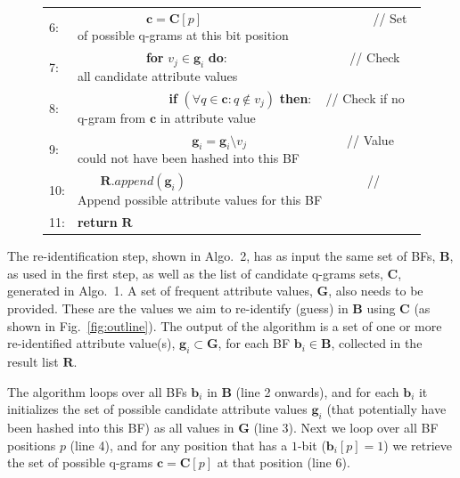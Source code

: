 \documentclass{llncs}
\begin{document}
\begin{figure}[t]
\begin{center}
\begin{scriptsize}
\begin{tabular}{ll}
  6:  & ~~~ ~~~ ~~~ $\mathbf{c} = \mathbf{C}[p]$  ~~~~~~~~~~~~~~~~
        ~~~~~~~~~\, // Set of possible q-grams at this bit position
        \\
  7:  & ~~~ ~~~ ~~~ \textbf{for} $v_j \in \mathbf{g}_i$ \textbf{do}: 
        ~~~~~~~~~~~~~~~~~~~// Check all candidate attribute
        values \\
  8:  & ~~~ ~~~ ~~~ ~~~ \textbf{if} $(\forall q \in \textbf{c}:
        q \notin v_j)$ \textbf{then}: ~ // Check if no q-gram from
        $\mathbf{c}$ in attribute value \\
  9:  & ~~~ ~~~ ~~~ ~~~ ~~~ $\mathbf{g}_i = \mathbf{g}_i \setminus
        v_j$ ~~~~~~~~~~~~~~~\,// Value could not have been hashed
        into this BF \\ 
  10: & ~~~ $\mathbf{R}.append(\mathbf{g}_i)$ ~~~~~~~~~~~~~~~~~~~~~
        ~~~~~~ // Append possible attribute values for this BF \\
  11: & \textbf{return} $\mathbf{R}$ \\
  \hline
  \end{tabular}
  \end{scriptsize}
  \end{center}
  \label{algo:step2}
\end{figure}

The re-identification step, shown in Algo.~2, has as input the same
set of BFs, $\mathbf{B}$, as used in the first step, as well as the
list of candidate q-grams sets, $\mathbf{C}$, generated in Algo.~1.
A set of frequent attribute values, $\mathbf{G}$, also needs to be
provided. These are the values we aim to re-identify (guess) in
$\mathbf{B}$ using $\mathbf{C}$ (as shown in
Fig.~\ref{fig:outline}). The output of the algorithm is a set
of one or more re-identified attribute value(s), $\mathbf{g}_i
\subset \mathbf{G}$, for each BF $\mathbf{b}_i \in \mathbf{B}$,
collected in the result list $\mathbf{R}$.

The algorithm loops over all BFs $\mathbf{b}_i$ in $\mathbf{B}$ (line
2 onwards), and for each $\mathbf{b}_i$ it initializes the set of
possible candidate attribute values $\mathbf{g}_i$ (that potentially
have been hashed into this BF) as all values in $\mathbf{G}$ (line 3).
Next we loop over all BF positions $p$ (line  4), and for any position
that has a $1$-bit ($\mathbf{b}_i[p] = 1$) we retrieve the set of
possible q-grams $\mathbf{c} = \mathbf{C}[p]$ at that position
(line 6).
\end{document}

